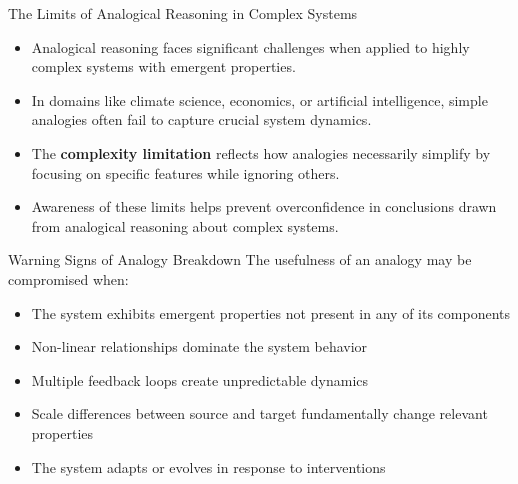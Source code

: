 \documentclass{beamer}
\begin{document}
\begin{frame}{The Limits of Analogical Reasoning in Complex Systems}
	\begin{itemize}
		\item Analogical reasoning faces significant challenges when applied to highly complex systems with emergent properties.
		\item In domains like climate science, economics, or artificial intelligence, simple analogies often fail to capture crucial system dynamics.
		\item The \textbf{complexity limitation} reflects how analogies necessarily simplify by focusing on specific features while ignoring others.
		\item Awareness of these limits helps prevent overconfidence in conclusions drawn from analogical reasoning about complex systems.
	\end{itemize}
	
	\begin{alertblock}{Warning Signs of Analogy Breakdown}
		\scriptsize
		The usefulness of an analogy may be compromised when:
		\begin{itemize}
			\item The system exhibits emergent properties not present in any of its components
			\item Non-linear relationships dominate the system behavior
			\item Multiple feedback loops create unpredictable dynamics
			\item Scale differences between source and target fundamentally change relevant properties
			\item The system adapts or evolves in response to interventions
		\end{itemize}
	\end{alertblock}
\end{frame}
\end{document}
